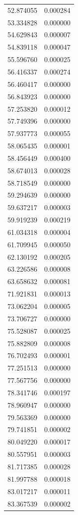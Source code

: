\begin{longtable}{rr}
52.874055 & 0.000284 \\
53.334828 & 0.000000 \\
54.629843 & 0.000007 \\
54.839118 & 0.000047 \\
55.596760 & 0.000025 \\
56.416337 & 0.000274 \\
56.460417 & 0.000000 \\
56.843923 & 0.000000 \\
57.253820 & 0.000012 \\
57.749396 & 0.000000 \\
57.937773 & 0.000055 \\
58.065435 & 0.000001 \\
58.456449 & 0.000400 \\
58.674013 & 0.000028 \\
58.718549 & 0.000000 \\
59.294639 & 0.000000 \\
59.637217 & 0.000003 \\
59.919239 & 0.000219 \\
61.034318 & 0.000004 \\
61.709945 & 0.000050 \\
62.130192 & 0.000205 \\
63.226586 & 0.000008 \\
63.658632 & 0.000081 \\
71.921831 & 0.000013 \\
73.062204 & 0.000005 \\
73.706727 & 0.000000 \\
75.528087 & 0.000025 \\
75.882809 & 0.000008 \\
76.702493 & 0.000001 \\
77.251513 & 0.000000 \\
77.567756 & 0.000000 \\
78.341746 & 0.000197 \\
78.960947 & 0.000000 \\
79.563369 & 0.000000 \\
79.741851 & 0.000002 \\
80.049220 & 0.000017 \\
80.557951 & 0.000003 \\
81.717385 & 0.000028 \\
81.997788 & 0.000018 \\
83.017217 & 0.000011 \\
83.367539 & 0.000002 \\

\end{longtable}
